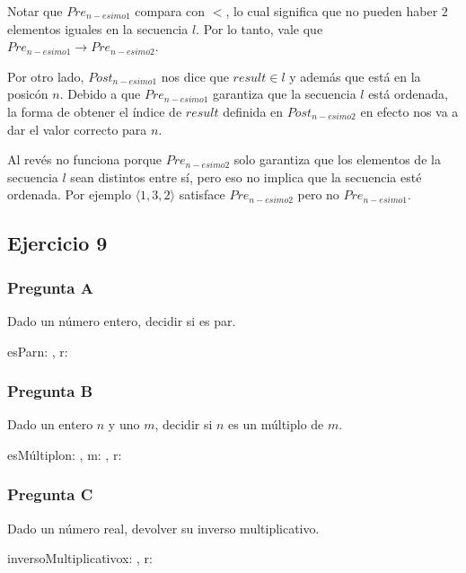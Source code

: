 Notar que $Pre_{n-esimo1}$ compara con $<$, lo cual significa que no pueden haber 2 elementos iguales en la secuencia $l$. Por lo tanto, vale que $Pre_{n-esimo1} \rightarrow Pre_{n-esimo2}$.

Por otro lado, $Post_{n-esimo1}$ nos dice que $result \in l $ y además que está en la posicón $n$. Debido a que $Pre_{n-esimo1}$ garantiza que la secuencia $l$ está ordenada, la forma de obtener el índice de $result$ definida en $Post_{n-esimo2}$ en efecto nos va a dar el valor correcto para $n$.

Al revés no funciona porque $Pre_{n-esimo2}$ solo garantiza que los elementos de la secuencia $l$ sean distintos entre sí, pero eso no implica que la secuencia esté ordenada. Por ejemplo $\langle 1,3,2 \rangle$ satisface $Pre_{n-esimo2}$ pero no $Pre_{n-esimo1}$.

\subsection{Ejercicio 9}

\subsubsection{Pregunta A}

Dado un número entero, decidir si es par.

\begin{proc}{esPar}{\In n: \ent, \Out r: \bool}{}
\end{proc}

\subsubsection{Pregunta B}

Dado un entero $n$ y uno $m$, decidir si $n$ es un múltiplo de $m$.

\begin{proc}{esMúltiplo}{\In n: \ent, \In m: \ent, \Out r: \bool}{}
\end{proc}

\subsubsection{Pregunta C}

Dado un número real, devolver su inverso multiplicativo.

\begin{proc}{inversoMultiplicativo}{\In x: \float, \Out r: \float}{}
\end{proc}


